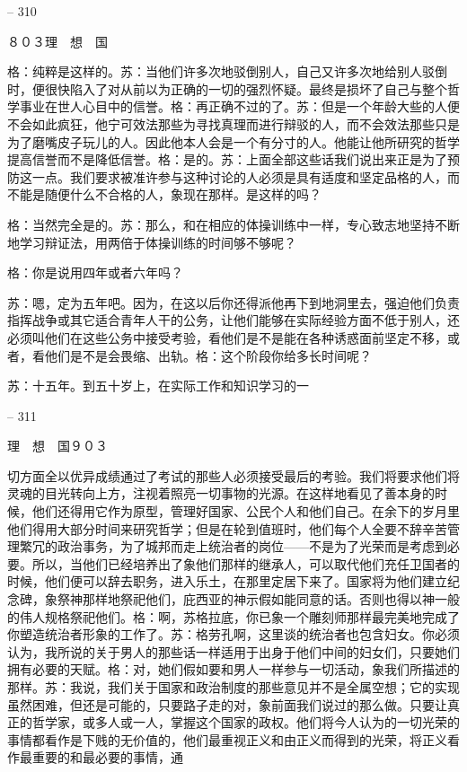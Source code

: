 \documentclass[11pt,oneside]{book}
\begin{document}
\begin{common-format}
    

-- 310

    ８０３理　想　国

    格：纯粹是这样的。苏：当他们许多次地驳倒别人，自己又许多次地给别人驳倒时，便很快陷入了对从前以为正确的一切的强烈怀疑。最终是损坏了自己与整个哲学事业在世人心目中的信誉。格：再正确不过的了。苏：但是一个年龄大些的人便不会如此疯狂，他宁可效法那些为寻找真理而进行辩驳的人，而不会效法那些只是为了磨嘴皮子玩儿的人。因此他本人会是一个有分寸的人。他能让他所研究的哲学提高信誉而不是降低信誉。格：是的。苏：上面全部这些话我们说出来正是为了预防这一点。我们要求被准许参与这种讨论的人必须是具有适度和坚定品格的人，而不能是随便什么不合格的人，象现在那样。是这样的吗？

    格：当然完全是的。苏：那么，和在相应的体操训练中一样，专心致志地坚持不断地学习辩证法，用两倍于体操训练的时间够不够呢？

    格：你是说用四年或者六年吗？

    苏：嗯，定为五年吧。因为，在这以后你还得派他再下到地洞里去，强迫他们负责指挥战争或其它适合青年人干的公务，让他们能够在实际经验方面不低于别人，还必须叫他们在这些公务中接受考验，看他们是不是能在各种诱惑面前坚定不移，或者，看他们是不是会畏缩、出轨。格：这个阶段你给多长时间呢？

    苏：十五年。到五十岁上，在实际工作和知识学习的一

    

-- 311

    理　想　国９０３

    切方面全以优异成绩通过了考试的那些人必须接受最后的考验。我们将要求他们将灵魂的目光转向上方，注视着照亮一切事物的光源。在这样地看见了善本身的时候，他们还得用它作为原型，管理好国家、公民个人和他们自己。在余下的岁月里他们得用大部分时间来研究哲学；但是在轮到值班时，他们每个人全要不辞辛苦管理繁冗的政治事务，为了城邦而走上统治者的岗位——不是为了光荣而是考虑到必要。所以，当他们已经培养出了象他们那样的继承人，可以取代他们充任卫国者的时候，他们便可以辞去职务，进入乐土，在那里定居下来了。国家将为他们建立纪念碑，象祭神那样地祭祀他们，庇西亚的神示假如能同意的话。否则也得以神一般的伟人规格祭祀他们。格：啊，苏格拉底，你已象一个雕刻师那样最完美地完成了你塑造统治者形象的工作了。苏：格劳孔啊，这里谈的统治者也包含妇女。你必须认为，我所说的关于男人的那些话一样适用于出身于他们中间的妇女们，只要她们拥有必要的天赋。格：对，她们假如要和男人一样参与一切活动，象我们所描述的那样。苏：我说，我们关于国家和政治制度的那些意见并不是全属空想；它的实现虽然困难，但还是可能的，只要路子走的对，象前面我们说过的那么做。只要让真正的哲学家，或多人或一人，掌握这个国家的政权。他们将今人认为的一切光荣的事情都看作是下贱的无价值的，他们最重视正义和由正义而得到的光荣，将正义看作最重要的和最必要的事情，通


\end{common-format}
\end{document}
